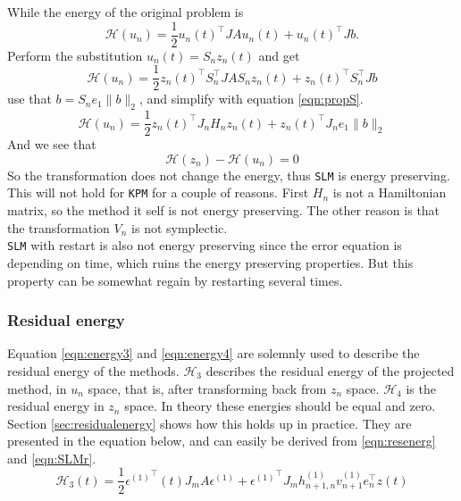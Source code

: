 While the energy of the original problem is 
\begin{equation*}
\mathcal{H}(u_n) = \frac{1}{2}u_n(t)^\top J A u_n(t) + u_n(t)^\top J b.
\end{equation*}
Perform the substitution $ u_n(t) = S_n z_n(t) $ and get
\begin{equation*}
\mathcal{H}(u_n) = \frac{1}{2}z_n(t)^\top S_n^\top J A S_n z_n(t) + z_n(t)^\top S_n^\top J b
\end{equation*}
use that $ b = S_n e_1 \| b \|_2 $, and simplify with equation \eqref{eqn:propS}.
\begin{equation*}
\mathcal{H}(u_n) = \frac{1}{2}z_n(t)^\top J_n H_n z_n(t) + z_n(t)^\top J_n e_1 \|b \|_2
\end{equation*}
And we see that 
\begin{equation*}
\mathcal{H}(z_n) - \mathcal{H}(u_n) = 0
\end{equation*}
So the transformation does not change the energy, thus \texttt{SLM} is energy preserving. This will not hold for \texttt{KPM} for a couple of reasons. First $H_n$ is not a Hamiltonian matrix, so the method it self is not energy preserving. The other reason is that the transformation $V_n$ is not symplectic.\\ 
\texttt{SLM} with restart is also not energy preserving since the error equation is depending on time, which ruins the energy preserving properties. But this property can be somewhat regain by restarting several times.
\subsubsection{Residual energy}
Equation \eqref{eqn:energy3} and \eqref{eqn:energy4} are solemnly used to describe the residual energy of the methods. $\mathcal{H}_3$ describes the residual energy of the projected method, in $u_n$ space, that is, after transforming back from $z_n$ space. $\mathcal{H}_4$ is the residual energy in $z_n$ space. In theory these energies should be equal and zero. Section \ref{sec:residualenergy} shows how this holds up in practice. 
They are presented in the equation below, and can easily be derived from \eqref{eqn:resenerg} and \eqref{eqn:SLMr}. \\
\begin{equation}
\mathcal{H}_3 (t) = \frac{1}{2} {\epsilon^{(1)}}^\top (t) J_m A \epsilon^{(1)} + {\epsilon^{(1)}}^\top J_m h_{n+1,n}^{(1)} v_{n+1}^{(1)} e_n^\top z(t)
\label{eqn:energy3}
\end{equation}

